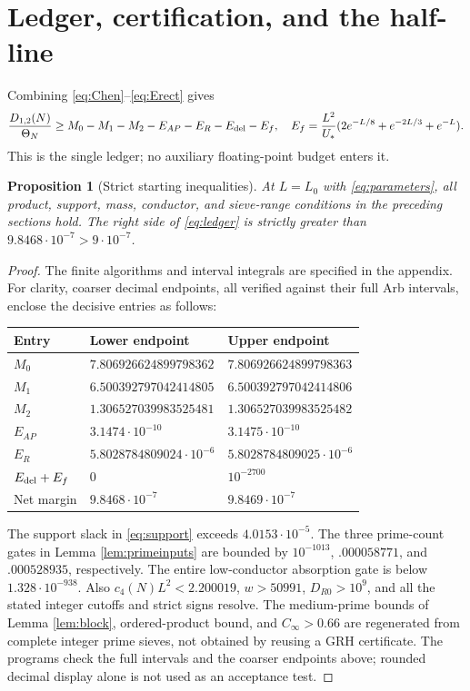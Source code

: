 \documentclass[11pt]{article}
\newtheorem{proposition}[theorem]{Proposition}
\theoremstyle{remark}\newtheorem{remark}[theorem]{Remark}
\newcommand{\Th}{\Theta_N}
\begin{document}
\section{Ledger, certification, and the half-line}\label{sec:ledger}
Combining \eqref{eq:Chen}--\eqref{eq:Erect} gives
\begin{equation}\label{eq:ledger}
\frac{D_{1,2}(N)}{\Th}\ge
M_0-M_1-M_2-E_{AP}-E_R-E_{\rm del}-E_f,
\quad E_f=\frac{L^2}{U_*}(2e^{-L/8}+e^{-2L/3}+e^{-L}).
\end{equation}
This is the single ledger; no auxiliary floating-point budget enters it.
\begin{proposition}[Strict starting inequalities]\label{prop:certificate}
At $L=L_0$ with \eqref{eq:parameters}, all product, support, mass,
conductor, and sieve-range conditions in the preceding sections hold.
The right side of \eqref{eq:ledger} is strictly greater than
$9.8468\cdot10^{-7}>9\cdot10^{-7}$.
\end{proposition}
\begin{proof}
The finite algorithms and interval integrals are specified in the appendix.
For clarity, coarser decimal endpoints, all verified against their full
Arb intervals, enclose the decisive entries as follows:
\begin{center}\begin{tabular}{lll}\toprule
Entry&Lower endpoint&Upper endpoint\\\midrule
$M_0$&$7.806926624899798362$&$7.806926624899798363$\\
$M_1$&$6.500392797042414805$&$6.500392797042414806$\\
$M_2$&$1.306527039983525481$&$1.306527039983525482$\\
$E_{AP}$&$3.1474\cdot10^{-10}$&$3.1475\cdot10^{-10}$\\
$E_R$&$5.8028784809024\cdot10^{-6}$&$5.8028784809025\cdot10^{-6}$\\
$E_{\rm del}+E_f$&$0$&$10^{-2700}$\\
Net margin&$9.8468\cdot10^{-7}$&$9.8469\cdot10^{-7}$\\\bottomrule
\end{tabular}\end{center}
The support slack in \eqref{eq:support} exceeds $4.0153\cdot10^{-5}$.
The three prime-count gates in Lemma \ref{lem:primeinputs} are bounded by
$10^{-1013}$, $.000058771$, and $.000528935$, respectively.
The entire low-conductor absorption gate is below $1.328\cdot10^{-938}$.
Also $c_4(N)L^2<2.200019$, $w>50991$,
$D_{R0}>10^9$, and all the stated integer cutoffs and strict signs resolve.
The medium-prime bounds of Lemma \ref{lem:block}, ordered-product bound,
and $C_\infty>0.66$ are regenerated from complete integer prime sieves,
not obtained by reusing a GRH certificate.
The programs check the full intervals and the coarser endpoints above;
rounded decimal display alone is not used as an acceptance test.
\end{proof}
\end{document}
